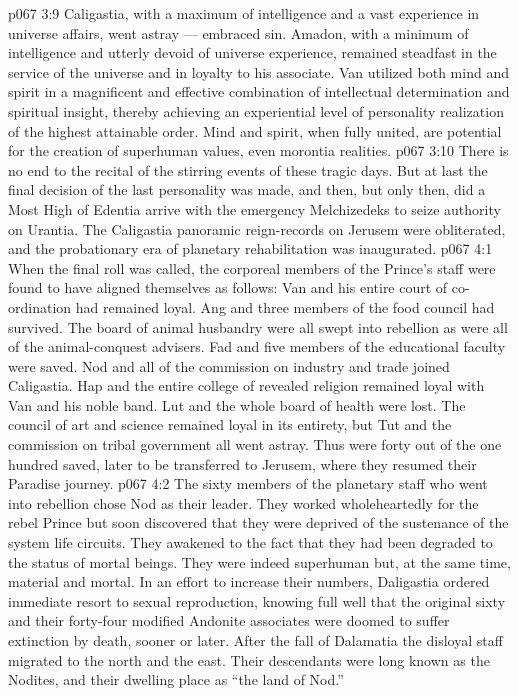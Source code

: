 \vs p067 3:9 Caligastia, with a maximum of intelligence and a vast experience in universe affairs, went astray --- embraced sin. Amadon, with a minimum of intelligence and utterly devoid of universe experience, remained steadfast in the service of the universe and in loyalty to his associate. Van utilized both mind and spirit in a magnificent and effective combination of intellectual determination and spiritual insight, thereby achieving an experiential level of personality realization of the highest attainable order. Mind and spirit, when fully united, are potential for the creation of superhuman values, even morontia realities.
\vs p067 3:10 There is no end to the recital of the stirring events of these tragic days. But at last the final decision of the last personality was made, and then, but only then, did a Most High of Edentia arrive with the emergency Melchizedeks to seize authority on Urantia. The Caligastia panoramic reign\hyp{}records on Jerusem were obliterated, and the probationary era of planetary rehabilitation was inaugurated.
\vs p067 4:1 When the final roll was called, the corporeal members of the Prince’s staff were found to have aligned themselves as follows: Van and his entire court of co\hyp{}ordination had remained loyal. Ang and three members of the food council had survived. The board of animal husbandry were all swept into rebellion as were all of the animal\hyp{}conquest advisers. Fad and five members of the educational faculty were saved. Nod and all of the commission on industry and trade joined Caligastia. Hap and the entire college of revealed religion remained loyal with Van and his noble band. Lut and the whole board of health were lost. The council of art and science remained loyal in its entirety, but Tut and the commission on tribal government all went astray. Thus were forty out of the one hundred saved, later to be transferred to Jerusem, where they resumed their Paradise journey.
\vs p067 4:2 The sixty members of the planetary staff who went into rebellion chose Nod as their leader. They worked wholeheartedly for the rebel Prince but soon discovered that they were deprived of the sustenance of the system life circuits. They awakened to the fact that they had been degraded to the status of mortal beings. They were indeed superhuman but, at the same time, material and mortal. In an effort to increase their numbers, Daligastia ordered immediate resort to sexual reproduction, knowing full well that the original sixty and their forty\hyp{}four modified Andonite associates were doomed to suffer extinction by death, sooner or later. After the fall of Dalamatia the disloyal staff migrated to the north and the east. Their descendants were long known as the Nodites, and their dwelling place as “the land of Nod.”
